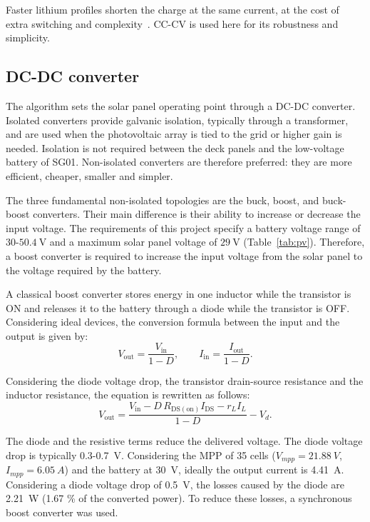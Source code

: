 \documentclass[conference]{IEEEtran}
\begin{document}
    Faster lithium profiles shorten the charge at the same current, at the cost of extra switching and complexity~\cite{Charging_Algorithms_Lithium_Ion_Batteries_Overview_2012,Review_Different_Charging_Techniques_Lithium_Polymer_Battery_2015}. CC-CV is used here for its robustness and simplicity. 


    \subsection{DC-DC converter}

    The algorithm sets the solar panel operating point through a DC-DC converter. Isolated converters provide galvanic isolation, typically through a transformer, and are used when the photovoltaic array is tied to the grid or higher gain is needed. Isolation is not required between the deck panels and the low-voltage battery of SG01. Non-isolated converters are therefore preferred: they are more efficient, cheaper, smaller and simpler.

    The three fundamental non-isolated topologies are the buck, boost, and buck-boost converters. Their main difference is their ability to increase or decrease the input voltage. The requirements of this project specify a battery voltage range of $30$-$50.4~\mathrm{V}$ and a maximum solar panel voltage of $29~\mathrm{V}$ (Table~\ref{tab:pv}). Therefore, a boost converter is required to increase the input voltage from the solar panel to the voltage required by the battery.

    A classical boost converter stores energy in one inductor while the transistor is ON and releases it to the battery through a diode while the transistor is OFF. Considering ideal devices, the conversion formula between the input and the output is given by:
    \begin{equation}
        V_{\mathrm{out}} = \frac{V_{\mathrm{in}}}{1-D}, \qquad I_{\mathrm{in}} = \frac{I_{\mathrm{out}}}{1-D}.
        \label{eq:boost}
    \end{equation}

    Considering the diode voltage drop, the transistor drain-source resistance and the inductor resistance, the equation is rewritten as follows:   
    \begin{equation}
        V_{\mathrm{out}} = \frac{V_{\mathrm{in}} - D\, R_{\mathrm{DS(on)}} I_{\mathrm{DS}} - r_L I_L}{1-D} - V_d.
        \label{eq:vout}
    \end{equation}

    The diode and the resistive terms reduce the delivered voltage. The diode voltage drop is typically 0.3-0.7~V. Considering the MPP of 35 cells ($V_{mpp}=21.88~V$, $I_{mpp}=6.05~A$) and the battery at 30~V, ideally the output current is 4.41~A. Considering a diode voltage drop of 0.5~V, the losses caused by the diode are 2.21~W (1.67 \% of the converted power). To reduce these losses, a synchronous boost converter was used.
\end{document}
